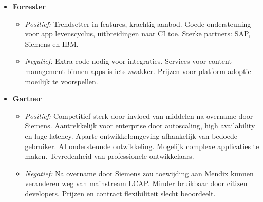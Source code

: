 \begin{itemize}
    \item \textbf{Forrester}
    \begin{itemize}
        \item \textit{Positief:} Trendsetter in features, krachtig aanbod. Goede ondersteuning voor app levenscyclus, uitbreidingen naar CI toe. Sterke partners: SAP, Siemens en IBM.
        \item \textit{Negatief:} Extra code nodig voor integraties. Services voor content management binnen apps is iets zwakker. Prijzen voor platform adoptie moeilijk te voorspellen.
    \end{itemize}
    \item \textbf{Gartner}
    \begin{itemize}
        \item \textit{Positief:} Competitief sterk door invloed van middelen na overname door Siemens. Aantrekkelijk voor enterprise door autoscaling, high availability en lage latency. Aparte ontwikkelomgeving afhankelijk van bedoede gebruiker. AI ondersteunde ontwikkeling. Mogelijk complexe applicaties te maken. Tevredenheid van professionele ontwikkelaars.
        \item \textit{Negatief:} Na overname door Siemens zou toewijding aan Mendix kunnen veranderen weg van mainstream LCAP. Minder bruikbaar door citizen developers. Prijzen en contract flexibiliteit slecht beoordeelt.
    \end{itemize}
\end{itemize}

 


